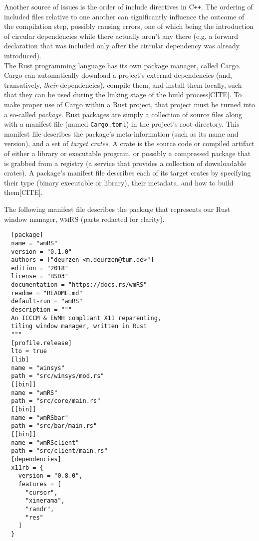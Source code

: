 Another source of issues is the order of include directives in C\texttt{++}. The
ordering of included  files relative to one another  can significantly influence
the outcome of the compilation step, possibly causing errors, one of which being
the introduction of circular dependencies  while there actually aren't any there
(e.g. a forward declaration that was included only after the circular dependency
was already introduced).\\


The Rust programming  language has its own package manager,  called Cargo. Cargo
can automatically download a project's external dependencies (and, transatively,
\textit{their} dependencies), compile them, and  install them locally, such that
they can be  used during the linking  stage of the build  process[CITE]. To make
proper use of  Cargo within a Rust  project, that project must be  turned into a
so-called  \textit{package}. Rust  packages are  simply a  collection of  source
files along  with a manifest  file (named \texttt{Cargo.toml}) in  the project's
root  directory. This  manifest  file describes  the package's  meta-information
(such as its name and version), and  a set of \textit{target crates}. A crate is
the source code or compiled artifact  of either a library or executable program,
or possibly a compressed package that is grabbed from a registry (a service that
provides  a  collection  of  downloadable crates).  A  package's  manifest  file
describes each of its target crates  by specifying their type (binary executable
or library), their metadata, and how to build them[CITE].

The  following manifest  file describes  the  package that  represents our  Rust
window manager, \textsc{wmRS} (parts redacted for clarity).

\begin{verbatim}
  [package]
  name = "wmRS"
  version = "0.1.0"
  authors = ["deurzen <m.deurzen@tum.de>"]
  edition = "2018"
  license = "BSD3"
  documentation = "https://docs.rs/wmRS"
  readme = "README.md"
  default-run = "wmRS"
  description = """
  An ICCCM & EWMH compliant X11 reparenting,
  tiling window manager, written in Rust
  """
  [profile.release]
  lto = true
  [lib]
  name = "winsys"
  path = "src/winsys/mod.rs"
  [[bin]]
  name = "wmRS"
  path = "src/core/main.rs"
  [[bin]]
  name = "wmRSbar"
  path = "src/bar/main.rs"
  [[bin]]
  name = "wmRSclient"
  path = "src/client/main.rs"
  [dependencies]
  x11rb = {
    version = "0.8.0",
    features = [
      "cursor",
      "xinerama",
      "randr",
      "res"
    ]
  }
\end{verbatim}

